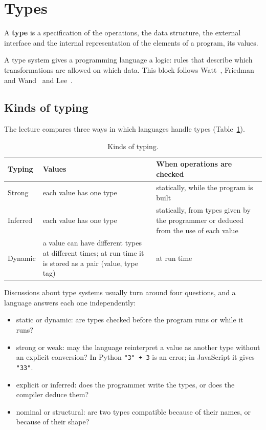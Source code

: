 \section{Types}
\label{sec:types}

\begin{definition}
A \textbf{type} is a specification of the operations, the data structure, the
external interface and the internal representation of the elements of a
program, its values.
\end{definition}

A type system gives a programming language a logic: rules that describe which
transformations are allowed on which data. This block follows
Watt~\cite[Ch.~2, 8]{watt2004concepts}, Friedman and
Wand~\cite[Ch.~4]{friedman2008essentials} and
Lee~\cite[Sec.~1.5]{lee2017foundations}.

\subsection{Kinds of typing}

The lecture compares three ways in which languages handle types
(Table~\ref{tab:typing-kinds}).

\begin{table}[h]
\centering
\small
\begin{tabular}{l p{} p{}}
  \toprule
  Typing & Values & When operations are checked \\
  \midrule
  Strong   & each value has one type & statically, while the program is built \\
  Inferred & each value has one type & statically, from types given by the programmer or deduced from the use of each value \\
  Dynamic  & a value can have different types at different times; at run time it is stored as a pair (value, type tag) & at run time \\
  \bottomrule
\end{tabular}
\caption{Kinds of typing.}
\label{tab:typing-kinds}
\end{table}

Discussions about type systems usually turn around four questions, and a
language answers each one independently:
\begin{itemize}
  \item static or dynamic: are types checked before the program runs or
    while it runs?
  \item strong or weak: may the language reinterpret a value as another type
    without an explicit conversion? In Python \lstinline|"3" + 3| is an
    error; in JavaScript it gives \lstinline|"33"|.
  \item explicit or inferred: does the programmer write the types, or does
    the compiler deduce them?
  \item nominal or structural: are two types compatible because of their
    names, or because of their shape?
\end{itemize}

